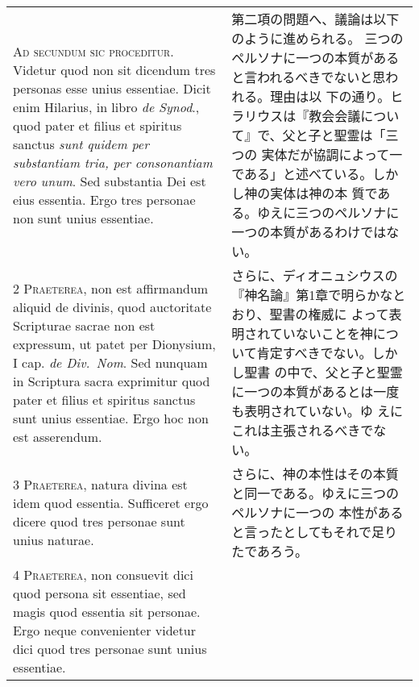 \documentclass[10pt]{jsarticle} %
\begin{document}
\begin{longtable}{p{21em}p{21em}}

{\Huge A}{\scshape d secundum sic proceditur}. Videtur quod non sit dicendum tres personas
esse unius essentiae. Dicit enim Hilarius, in libro {\itshape de Synod}., quod
pater et filius et spiritus sanctus {\itshape sunt quidem per substantiam tria,
per consonantiam vero unum}. Sed substantia Dei est eius essentia. Ergo
tres personae non sunt unius essentiae.


&

第二項の問題へ、議論は以下のように進められる。
三つのペルソナに一つの本質があると言われるべきでないと思われる。理由は以
 下の通り。ヒラリウスは『教会会議について』で、父と子と聖霊は「三つの
 実体だが協調によって一である」と述べている。しかし神の実体は神の本
 質である。ゆえに三つのペルソナに一つの本質があるわけではない。

\\



2 {\scshape Praeterea}, non est affirmandum aliquid de divinis, quod auctoritate
Scripturae sacrae non est expressum, ut patet per Dionysium, I cap. {\itshape de
Div.~Nom}. Sed nunquam in Scriptura sacra exprimitur quod pater et filius
et spiritus sanctus sunt unius essentiae. Ergo hoc non est asserendum.


&

さらに、ディオニュシウスの『神名論』第1章で明らかなとおり、聖書の権威に
 よって表明されていないことを神について肯定すべきでない。しかし聖書
 の中で、父と子と聖霊に一つの本質があるとは一度も表明されていない。ゆ
 えにこれは主張されるべきでない。

\\



3 {\scshape Praeterea}, natura divina est idem quod essentia. Sufficeret ergo dicere
quod tres personae sunt unius naturae.


&

さらに、神の本性はその本質と同一である。ゆえに三つのペルソナに一つの
本性があると言ったとしてもそれで足りたであろう。


\\



4 {\scshape Praeterea}, non consuevit dici quod persona sit essentiae, sed magis quod
essentia sit personae. Ergo neque convenienter videtur dici quod tres
personae sunt unius essentiae.


&


\end{longtable}
\end{document}
